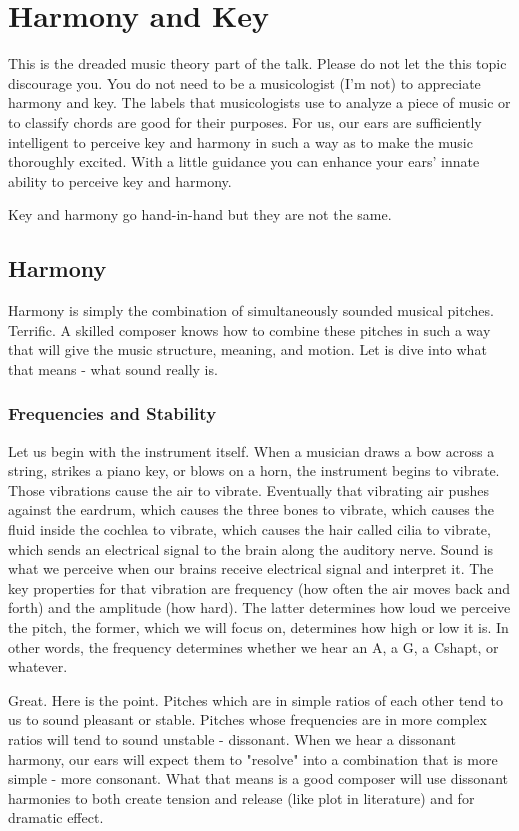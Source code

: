 \chapter{Harmony and Key}
This is the dreaded music theory part of the talk. Please do not let the this topic discourage you. You do not need to be a musicologist (I'm not) to appreciate harmony and key. The labels that musicologists use to analyze a piece of music or to classify chords are good for their purposes. For us, our ears are sufficiently intelligent to perceive key and harmony in such a way as to make the music thoroughly excited. With a little guidance you can enhance your ears' innate ability to perceive key and harmony.

Key and harmony go hand-in-hand but they are not the same.

\section{Harmony}
Harmony is simply the combination of simultaneously sounded musical pitches. Terrific. A skilled composer knows how to combine these pitches in such a way that will give the music structure, meaning, and motion. Let is dive into what that means - what sound really is.

\subsection{Frequencies and Stability}
Let us begin with the instrument itself. When a musician draws a bow across a string, strikes a piano key, or blows on a horn, the instrument begins to vibrate. Those vibrations cause the air to vibrate.  Eventually that vibrating air pushes against the eardrum, which causes the three bones to vibrate, which causes the fluid inside the cochlea to vibrate, which causes the hair called cilia to vibrate, which sends an electrical signal to the brain along the auditory nerve. Sound is what we perceive when our brains receive electrical signal and interpret it. The key properties for that vibration are frequency (how often the air moves back and forth) and the amplitude (how hard). The latter determines how loud we perceive the pitch, the former, which we will focus on, determines how high or low it is. In other words, the frequency determines whether we hear an A, a G, a Cshapt, or whatever.


Great. Here is the point. Pitches which are in simple ratios of each other tend to us to sound pleasant or stable. Pitches whose frequencies are in more complex ratios will tend to sound unstable - dissonant.  %
When we hear a dissonant harmony, our ears will expect them to "resolve" into a combination that is more simple - more consonant. 
What that means is a good composer will use dissonant harmonies to both create tension and release (like plot in literature) and for dramatic effect.


